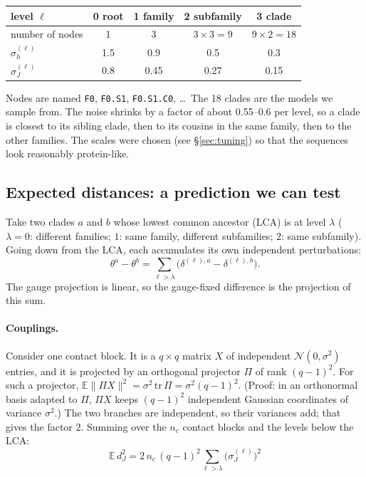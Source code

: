 \documentclass[11pt,a4paper]{article}
\newcommand{\E}{\mathbb{E}}
\begin{document}
\begin{center}
\begin{tabular}{lcccc}
\toprule
level $\ell$ & 0 root & 1 family & 2 subfamily & 3 clade\\
\midrule
number of nodes & 1 & 3 & $3\times3=9$ & $9\times2=18$\\
$\sigma_h^{(\ell)}$ & 1.5 & 0.9 & 0.5 & 0.3\\
$\sigma_J^{(\ell)}$ & 0.8 & 0.45 & 0.27 & 0.15\\
\bottomrule
\end{tabular}
\end{center}
Nodes are named \texttt{F0}, \texttt{F0.S1}, \texttt{F0.S1.C0}, \dots\ The 18 clades are the models we
sample from. The noise shrinks by a factor of about 0.55--0.6 per level, so a clade is closest to its
sibling clade, then to its cousins in the same family, then to the other families. The scales were
chosen (see \S\ref{sec:tuning}) so that the sequences look reasonably protein-like.

\subsection{Expected distances: a prediction we can test}\label{sec:theory}
Take two clades $a$ and $b$ whose lowest common ancestor (LCA) is at level $\lambda$
($\lambda=0$: different families; $1$: same family, different subfamilies; $2$: same subfamily).
Going down from the LCA, each accumulates its own independent perturbations:
\[
\theta^a-\theta^b = \sum_{\ell>\lambda}\big(\delta^{(\ell),a}-\delta^{(\ell),b}\big).
\]
The gauge projection is linear, so the gauge-fixed difference is the projection of this sum.

\paragraph{Couplings.} Consider one contact block. It is a $q\times q$ matrix $X$ of independent
$\mathcal{N}(0,\sigma^2)$ entries, and it is projected by an orthogonal projector $\Pi$ of rank $(q-1)^2$. For
such a projector, $\E\|\Pi X\|^2 = \sigma^2\,\mathrm{tr}\,\Pi = \sigma^2(q-1)^2$. (Proof: in an orthonormal
basis adapted to $\Pi$, $\Pi X$ keeps $(q-1)^2$ independent Gaussian coordinates of variance $\sigma^2$.)
The two branches are independent, so their variances add; that gives the factor 2. Summing over the
$n_c$ contact blocks and the levels below the LCA:
\begin{equation}\label{eq:dJ}
\boxed{\;\E\,d_J^2 = 2\,n_c\,(q-1)^2\sum_{\ell>\lambda}\big(\sigma_J^{(\ell)}\big)^2\;}
\end{equation}
\end{document}
